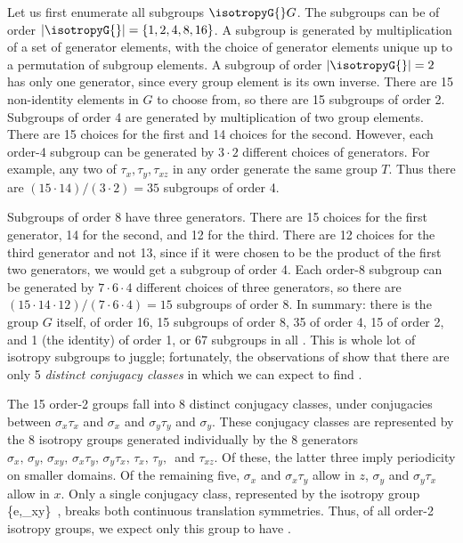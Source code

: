 \begin{description}
Let us first enumerate all subgroups $\isotropyG{}  G$.
The subgroups can be of order
$|\isotropyG{}| = \{1,2,4,8,16\}$.
A subgroup is generated by multiplication of a set of
generator elements, with the choice of
generator elements unique up to a permutation of subgroup
elements.
A subgroup of order $|\isotropyG{}| =  2$ has only one generator,
since every group element is its own inverse. There are 15
non-identity elements in $G$ to choose from, so there are 15 subgroups
of order 2.
Subgroups of order 4 are generated by multiplication of two
group elements. There are 15 choices for the first and 14
choices for the second. However, each order-4 subgroup
can be generated by $3 \cdot 2$ different choices of generators.
For example, any two of $\tau_x, \tau_y, \tau_{xz}$ in any order
generate the same group $T$. Thus there are $(15 \cdot 14)/(3 \cdot 2) = 35$
subgroups of order 4.

Subgroups of order 8 have three generators.  There are
15 choices for the first generator, 14 for the second, and 12 for the
third. There are 12 choices for the third
generator and not  13, since if it were chosen to be the product of the
first two generators, we would get a subgroup of order 4.
Each order-8 subgroup can be generated
by $7 \cdot 6 \cdot 4$ different choices of three generators, so there are
$(15 \cdot 14 \cdot 12)/(7 \cdot 6 \cdot 4) = 15$ subgroups of order 8.
In summary: there is the group $G$ itself, of order 16,
15 subgroups of order 8, 35 of order 4, 15 of
order 2, and 1 (the identity) of order 1,
or 67 subgroups in all .
This is whole lot of isotropy subgroups to juggle; fortunately,
the observations of  show that there
are only 5 {\em distinct conjugacy classes} in which we can expect
to find \eqva.

The 15 order-2 groups fall into 8 distinct conjugacy
classes, under conjugacies between $\sigma_x \tau_x$ and $\sigma_x$
and $\sigma_y \tau_y$ and $\sigma_y$. These conjugacy classes are
represented by the 8 isotropy groups generated individually by the 8
generators
$\sigma_x,\, \sigma_y,\, \sigma_{xy},\, \sigma_x \tau_y,\,  \sigma_y \tau_x,\,
\tau_x,\, \tau_y,\,$ and $\tau_{xz}$. Of these, the latter three imply
periodicity on smaller domains. Of the remaining five,
$\sigma_x$ and $\sigma_x \tau_y$ allow {\reqva} in $z$,
$\sigma_y$ and $\sigma_y \tau_x$ allow {\reqva} in $x$.
Only a single conjugacy class, represented by the isotropy
group
\beq
  \{e,\sigma_{xy}\}
\,,
breaks both continuous translation symmetries. Thus, of all
order-2  isotropy groups, we expect only this group to have {\eqva}.


\end{description}
